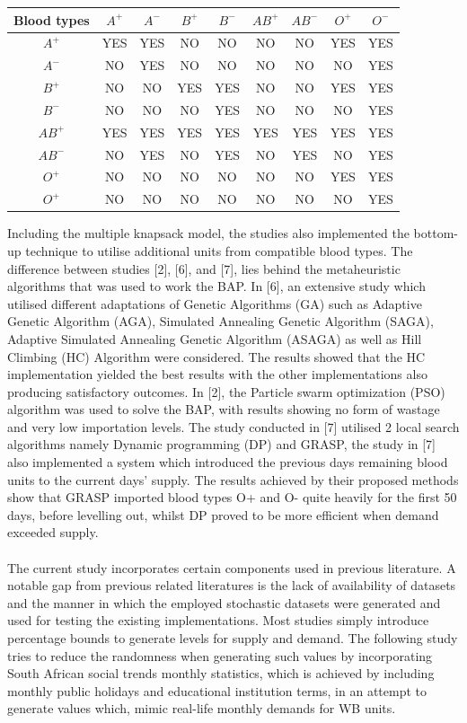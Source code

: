 \documentclass{article}
\begin{document}
    
\begin{center}
\begin {tabular}{|c|c|c|c|c|c|c|c|c|}
\hline

Blood types& $A^+$&$A^-$&$B^+$& $B^-$& $AB^+$& $AB^-$&  $O^+$& $O^-$ \\ [0.5ex]
\hline
 $A^+$&YES&YES&NO&NO&NO&NO&YES&YES\\
 $A^-$&NO&YES&NO&NO&NO&NO&NO&YES\\
 $B^+$&NO&NO&YES&YES&NO&NO&YES&YES\\
$B^-$&NO&NO&NO&YES&NO&NO&NO&YES\\
$AB^+$&YES&YES&YES&YES&YES&YES&YES&YES\\
$AB^-$&NO&YES&NO&YES&NO&YES&NO&YES\\
$O^+$&NO&NO&NO&NO&NO&NO&YES&YES\\
$O^+$&NO&NO&NO&NO&NO&NO&NO&YES\\
\hline

\end {tabular}

\end {center}
Including the multiple knapsack model, the studies also implemented the bottom-up technique to utilise additional units from compatible blood types. The difference between studies [2], [6], and [7], lies behind the metaheuristic algorithms that was used to work the BAP. In [6], an extensive study which utilised different adaptations of Genetic Algorithms (GA) such as Adaptive Genetic Algorithm (AGA), Simulated Annealing Genetic Algorithm (SAGA), Adaptive Simulated Annealing Genetic Algorithm (ASAGA) as well as Hill Climbing (HC) Algorithm were considered. The results showed that the HC implementation yielded the best results with the other implementations also producing satisfactory outcomes. In [2], the Particle swarm optimization (PSO) algorithm was used to solve the BAP, with results showing no form of wastage and very low importation levels. The study conducted in [7] utilised 2 local search algorithms namely Dynamic programming (DP) and GRASP, the study in [7] also implemented a system which introduced the previous days remaining blood units to the current days’ supply. The results achieved by their proposed methods show that GRASP imported blood types O+ and O- quite heavily for the first 50 days, before levelling out, whilst DP proved to be more efficient when demand exceeded supply.
\\
\\
The current study incorporates certain components used in previous literature. A notable gap from previous related literatures is the lack of availability of datasets and the manner in which the employed stochastic datasets were generated and used for testing the existing implementations. Most studies simply introduce percentage bounds to generate levels for supply and demand. The following study tries to reduce the randomness when generating such values by incorporating South African social trends monthly statistics, which is achieved by including monthly public holidays and educational institution terms, in an attempt to generate values which, mimic real-life monthly demands for WB units. 
\end{document}
